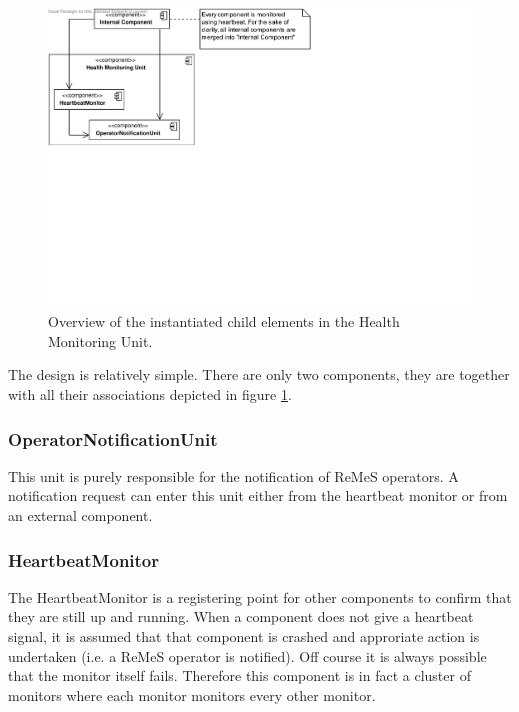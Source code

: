 \begin{figure}[H]
	\begin{centering}
		\includegraphics[width=\textwidth]{figs/add-it9-elements.pdf}
		\caption{Overview of the instantiated child elements in the Health Monitoring
		Unit.}
		\label{fig:it9/elements}
	\end{centering}
\end{figure}

\npar The design is relatively simple. There are only two components, they are
together with all their associations depicted in figure \ref{fig:it9/elements}.
\subsubsection{OperatorNotificationUnit}

\npar This unit is purely responsible for the notification of ReMeS operators. A
notification request can enter this unit either from the heartbeat monitor or
from an external component.

\subsubsection{HeartbeatMonitor}

\npar The HeartbeatMonitor is a registering point for other components to
confirm that they are still up and running. When a component does not give a
heartbeat signal, it is assumed that that component is crashed and approriate
action is undertaken (i.e. a ReMeS operator is notified). Off course it is
always possible that the monitor itself fails. Therefore this component is in
fact a cluster of monitors where each monitor monitors every other monitor.

